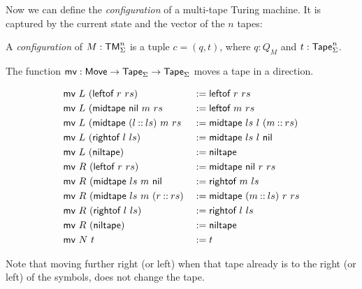 
Now we can define the \emph{configuration} of a multi-tape Turing machine.  It is captured by the current state and the vector of the $n$ tapes:
\begin{definition}[Configuration]
  \label{def:config}
  A \emph{configuration} of $M: \textsf{TM}_\Sigma^n$ is a tuple $c = (q, t)$, where $q: Q_M$ and $t: \textsf{Tape}_\Sigma^n$.
\end{definition}

The function $\textsf{mv} : \textsf{Move} \rightarrow \textsf{Tape}_\Sigma \rightarrow \textsf{Tape}_\Sigma$ moves a tape in a direction.
\begin{definition}
  \begin{alignat*}{2}
    & \textsf{mv}~L~(\textsf{leftof}~r~rs)              &&:= \textsf{leftof}~r~rs \\
    & \textsf{mv}~L~(\textsf{midtape}~\textsf{nil}~m~rs         &&:= \textsf{leftof}~m~rs \\
    & \textsf{mv}~L~(\textsf{midtape}~(l \mathbin{::} ls)~m~rs &&:= \textsf{midtape}~ls~l~(m \mathbin{::} rs) \\
    & \textsf{mv}~L~(\textsf{rightof}~l~ls)             &&:= \textsf{midtape}~ls~l~\textsf{nil} \\
    & \textsf{mv}~L~(\textsf{niltape})                  &&:= \textsf{niltape} \\
    & \textsf{mv}~R~(\textsf{leftof}~r~rs)              &&:= \textsf{midtape}~\textsf{nil}~r~rs \\
    & \textsf{mv}~R~(\textsf{midtape}~ls~m~\textsf{nil}         &&:= \textsf{rightof}~m~ls \\
    & \textsf{mv}~R~(\textsf{midtape}~ls~m~(r \mathbin{::} rs) &&:= \textsf{midtape}~(m \mathbin{::} ls)~r~rs \\
    & \textsf{mv}~R~(\textsf{rightof}~l~ls)             &&:= \textsf{rightof}~l~ls \\
    & \textsf{mv}~R~(\textsf{niltape})                  &&:= \textsf{niltape} \\
    & \textsf{mv}~N~t                               &&:= t
  \end{alignat*}
\end{definition}
Note that moving further right (or left) when that tape already is to the right (or left) of the symbols, does not change the tape.

